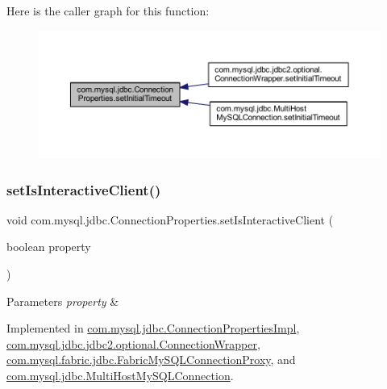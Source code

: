 Here is the caller graph for this function\+:\nopagebreak
\begin{figure}[H]
\begin{center}
\leavevmode
\includegraphics[width=350pt]{interfacecom_1_1mysql_1_1jdbc_1_1_connection_properties_aaf6a88938cc10d9607cbcba5f3ac75a2_icgraph}
\end{center}
\end{figure}
\mbox{\label{interfacecom_1_1mysql_1_1jdbc_1_1_connection_properties_a8157f1dda8d47aca668811bb7c932ec0}} 
\subsubsection{\texorpdfstring{set\+Is\+Interactive\+Client()}{setIsInteractiveClient()}}
{\footnotesize\ttfamily void com.\+mysql.\+jdbc.\+Connection\+Properties.\+set\+Is\+Interactive\+Client (\begin{DoxyParamCaption}\item[{boolean}]{property }\end{DoxyParamCaption})}


\begin{DoxyParams}{Parameters}
{\em property} & \\
\hline
\end{DoxyParams}


Implemented in \mbox{\hyperlink{classcom_1_1mysql_1_1jdbc_1_1_connection_properties_impl_a3c7b14f4dad2d26029d71084eaec57b0}{com.\+mysql.\+jdbc.\+Connection\+Properties\+Impl}}, \mbox{\hyperlink{classcom_1_1mysql_1_1jdbc_1_1jdbc2_1_1optional_1_1_connection_wrapper_a62fdb1de695db692ac572889bc2299c8}{com.\+mysql.\+jdbc.\+jdbc2.\+optional.\+Connection\+Wrapper}}, \mbox{\hyperlink{classcom_1_1mysql_1_1fabric_1_1jdbc_1_1_fabric_my_s_q_l_connection_proxy_ab60512f2b44a395cd400a68c437bac9a}{com.\+mysql.\+fabric.\+jdbc.\+Fabric\+My\+S\+Q\+L\+Connection\+Proxy}}, and \mbox{\hyperlink{classcom_1_1mysql_1_1jdbc_1_1_multi_host_my_s_q_l_connection_ae0dcc145ddb08238e1cc8af9139af39f}{com.\+mysql.\+jdbc.\+Multi\+Host\+My\+S\+Q\+L\+Connection}}.

